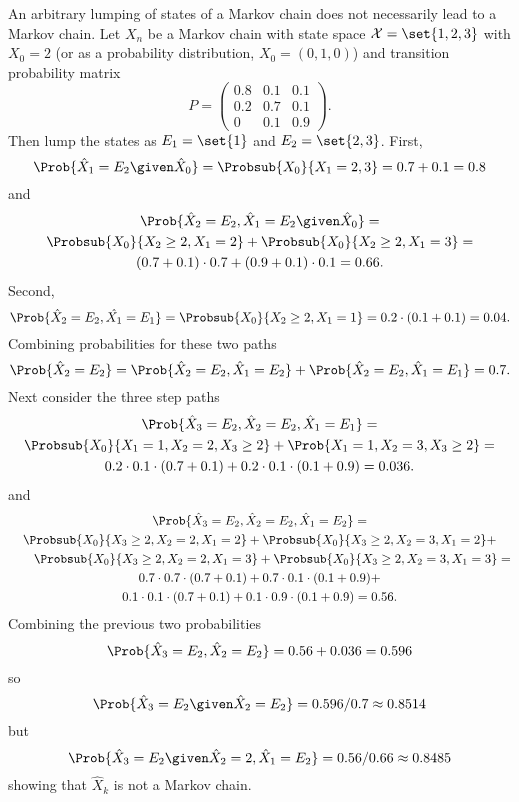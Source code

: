 \documentclass[12pt]{article}
\begin{document}
\begin{example}
    An arbitrary lumping of states of a Markov chain does not
    necessarily lead to a Markov chain.  Let \( X_n \) be a Markov chain
    with state space \( \mathcal{X} = \set{1, 2, 3} \) with \( X_0 = 2 \)
    (or as a probability distribution, \( X_0 = (0,1,0) \)) and
    transition probability matrix
    \[
        P =
        \begin{pmatrix}
            0.8 & 0.1 & 0.1 \\
            0.2 & 0.7 & 0.1 \\
            0 & 0.1 & 0.9
        \end{pmatrix}
        .
    \] Then lump the states as \( E_1 = \set{1} \) and \( E_2 = \set{2,3}
    \).  First,
    \[
        \Prob{\hat{X}_1 = E_2 \given \hat{X}_0} = \Probsub{X_0}{X_1 =
        2,3} = 0.7 + 0.1 = 0.8
    \] and
    \begin{multline*}
        \Prob{\hat{X}_2 = E_2, \hat{X}_1 = E_2 \given \hat{X}_0 } = \\
        \Probsub{X_0}{X_2 \ge 2, X_1 = 2} + \Probsub{X_0}{X_2 \ge 2, X_1
        = 3} = \\
        (0.7 + 0.1) \cdot 0.7 + (0.9 + 0.1) \cdot 0.1 = 0.66.
    \end{multline*}
    Second,
    \[
        \Prob{\hat{X}_2 = E_2, \hat{X_1} = E_1} = \Probsub{X_0}{ X_2 \ge
        2, X_1 = 1} = 0.2 \cdot (0.1 + 0.1) = 0.04.
    \] Combining probabilities for these two paths
    \[
        \Prob{\hat{X}_2 = E_2} = \Prob{\hat{X}_2 =E_2, \hat{X}_1 = E_2}
        + \Prob{\hat{X}_2=E_2, \hat{X}_1 = E_1} = 0.7.
    \] Next consider the three step paths
    \begin{multline*}
        \Prob{\hat{X}_3 = E_2, \hat{X}_2=E_2, \hat{X}_1=E_1} = \\
        \Probsub{X_0}{X_1=1, X_2=2, X_3 \ge 2} + \Prob{X_1=1, X_2=3, X_3
        \ge 2} = \\
        0.2 \cdot 0.1 \cdot (0.7+0.1) + 0.2 \cdot 0.1 \cdot (0.1+0.9) =
        0.036.
    \end{multline*}
    and
    \begin{multline*}
        \Prob{\hat{X}_3 = E_2, \hat{X}_2=E_2, \hat{X}_1=E_2} = \\
        \Probsub{X_0}{X_3 \ge 2, X_2=2, X_1=2} + \Probsub{X_0}{X_3 \ge
        2, X_2=3, X_1=2} +\\
        \qquad \Probsub{X_0}{X_3 \ge 2, X_2=2, X_1=3} + \Probsub{X_0}{X_3
        \ge 2, X_2=3, X_1=3} = \\
        0.7 \cdot 0.7 \cdot (0.7 + 0.1) + 0.7 \cdot 0.1 \cdot (0.1 + 0.9)
        + \\
        0.1 \cdot 0.1 \cdot (0.7 + 0.1) + 0.1 \cdot 0.9 \cdot (0.1 + 0.9)
        = 0.56.
    \end{multline*}
    Combining the previous two probabilities
    \[
        \Prob{\hat{X}_3 = E_2, \hat{X}_2 = E_2} = 0.56 + 0.036 = 0.596
    \] so
    \[
        \Prob{\hat{X}_3=E_2 \given \hat{X}_2 = E_2} = 0.596/0.7 \approx
        0.8514
    \] but
    \[
        \Prob{\hat{X}_3 = E_2 \given \hat{X}_2 = 2, \hat{X}_1=E_2} =
        0.56/0.66 \approx 0.8485
    \] showing that \( \hat{X}_k \) is not a Markov chain.
\end{example}
\end{document}
